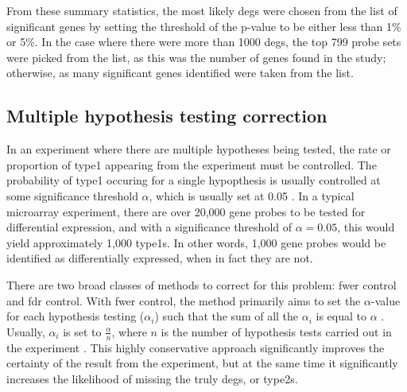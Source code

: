 From these summary statistics, the most likely \glspl{deg} were chosen from the list of significant genes by setting the threshold of the p-value to be either less than 1\% or 5\%.
In the case where there were more than 1000 \glspl{deg}, the top 799 probe sets were picked from the list, as this was the number of genes found in the \citet{Creighton2012} study; otherwise, as many significant genes identified were taken from the list.

\subsection{Multiple hypothesis testing correction}
\label{sub:multiple_hypothesis_testing_correction}

In an experiment where there are multiple hypotheses being tested, the rate or proportion of \gls{type1} appearing from the experiment must be controlled.
The probability of \gls{type1} occuring for a single hypopthesis is usually controlled at some significance threshold $\alpha$, which is usually set at 0.05 \citep{Shaffer1995}.
In a typical microarray experiment, there are over 20,000 gene probes to be tested for differential expression, and with a significance threshold of $\alpha = 0.05$, this would yield approximately 1,000 \glspl{type1}.
In other words, 1,000 gene probes would be identified as differentially expressed, when in fact they are not.

There are two broad classes of methods to correct for this problem: \gls{fwer} control and \gls{fdr} control.
With \gls{fwer} control, the method primarily aims to set the $\alpha$-value for each hypothesis testing ($\alpha_i$) such that the sum of all the $\alpha_i$ is equal to $\alpha$ \citep{Hochberg1987,Shaffer1995}.
Usually, $\alpha_i$ is set to $\frac{\alpha}{n}$, where $n$ is the number of hypothesis tests carried out in the experiment \citep{Shaffer1995}.
This highly conservative approach significantly improves the certainty of the result from the experiment, but at the same time it significantly increases the likelihood of missing the truly \glspl{deg}, or \glspl{type2}.

